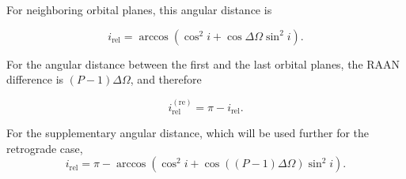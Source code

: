 For neighboring orbital planes, this angular distance is

\begin{equation}\label{eq:i_rel}
i_{\mathrm{rel}}=\arccos\left(\cos^2 i+\cos\Delta\Omega\sin^2 i\right).
\end{equation}

For the angular distance between the first and the last orbital planes, the RAAN difference is $(P-1)\Delta\Omega$, and therefore

\begin{equation}\label{eq:i_rel_re}
i_{\mathrm{rel}}^{(\mathrm{re})}=\pi-i_{\mathrm{rel}}.
\end{equation}

For the supplementary angular distance, which will be used further for the retrograde case,
\begin{equation}
i_{\mathrm{rel}}=\pi-\arccos\left(\cos^2 i+\cos\left((P-1)\Delta\Omega\right)\sin^2 i\right).
\end{equation}
